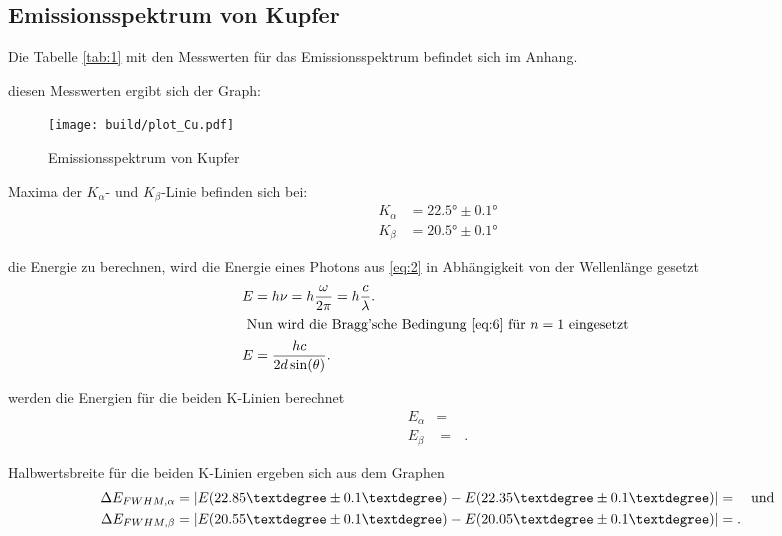 \subsection{Emissionsspektrum von Kupfer}

Die Tabelle \ref{tab:1} mit den Messwerten für das Emissionsspektrum befindet sich im Anhang.

\justifying diesen Messwerten ergibt sich der Graph:
\begin{figure}[H]
    \centering
    \texttt{[image: build/plot\_Cu.pdf]}
    \caption{Emissionsspektrum von Kupfer\cite{matplotlib}} 
    \label{fig:3}
\end{figure}

\justifying Maxima der $K_{\alpha} $- und $K_{\beta} $-Linie befinden sich bei:
\begin{subequations}
\begin{align}
    K_{\alpha} &= 22.5°\pm 0.1° \label{10a} \\
    K_{\beta} &= 20.5°\pm 0.1° \label{10b}
\end{align}
\end{subequations}

\justifying die Energie zu berechnen, wird die Energie eines Photons 
aus \eqref{eq:2} in Abhängigkeit von der Wellenlänge gesetzt
\begin{align}
    E &= h \nu = h \frac{\omega}{2 \pi}=h \frac{c}{\lambda}. \label{eq:11}\\
    \intertext{
        Nun wird die Bragg'sche Bedingung \eqref{eq:6} für $n=1$ eingesetzt
    }
    E &= \frac{hc}{2d\sin(\theta)} \label{eq:12}.
\end{align}

\justifying werden die Energien für die beiden K-Linien berechnet
\begin{subequations}
\begin{align}
    E_{\alpha} &= \text{ }   \label{eq:13a} \\
    E_{\beta} &=   \text{ } \label{eq:13b} .
\end{align}
\end{subequations}

\justifying Halbwertsbreite für die beiden K-Linien ergeben sich aus dem Graphen
\begin{subequations}
\begin{align}
    \Delta E_{FWHM ,\alpha} &=\abs{E(22.85°\pm 0.1°)-E(22.35°\pm 0.1°)} = \text{} \label{eq:14a} \quad\text{und} \\
    \Delta E_{FWHM ,\beta} &= \abs{E(20.55°\pm 0.1°)-E(20.05°\pm 0.1°) }= \text{} \label{eq:14b}.
\end{align}
\end{subequations}

